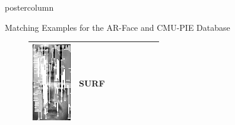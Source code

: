 \documentclass[final,hyperref={pdfpagelabels=false}]{beamer}
\begin{document}
\begin{frame}
\begin{columns}
\begin{column}{.49\textwidth}
\begin{beamercolorbox}[center,wd=\textwidth]{postercolumn}
\begin{minipage}[T]{.95\textwidth}
{\begin{block}{Matching Examples for the AR-Face and CMU-PIE Database}
\begin{figure}
\begin{tabular}{p{.09\linewidth} | p{.12\linewidth} | p{.12\linewidth} | p{.12\linewidth} || p{.12\linewidth} | p{.12\linewidth} | p{.12\linewidth} | p{.09\linewidth} }
                  \includegraphics[width=1.0\linewidth]{paper/bmvc09-surf/figures/matchings/cmupie-surf/grid-best_07-27-22.pgm--07-27-08}
                  &
                  SURF
                  \\
                  \hline

\end{tabular}
\end{figure}
\end{block}}
\end{minipage}
\end{beamercolorbox}
\end{column}
\end{columns}
\end{frame}
\end{document}
